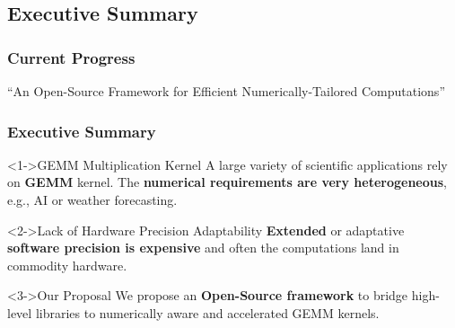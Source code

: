 \graphicspath{{../../../PhD/paper_factory/thesis_louis/Chapter5/Figs/}}
\subsection{Executive Summary}
\begin{frame}
    \frametitle{Current Progress}

    \centering
    \huge ``An Open-Source Framework for Efficient Numerically-Tailored Computations''
    \normalsize

    \vspace{1em} %

    \tableofcontents[currentsection,
                     subsectionstyle=show/shaded/hide,
                     sectionstyle=show/hide]

\end{frame}


\begin{frame}
    \frametitle{Executive Summary}

        \begin{block}<1->{GEMM Multiplication Kernel}
		A large variety of scientific applications rely on \textbf{GEMM } kernel. The \textbf{numerical requirements are very heterogeneous}, e.g., AI or weather forecasting.
        \end{block}

        \begin{exampleblock}<2->{Lack of Hardware Precision Adaptability}
		\textbf{Extended} or adaptative \textbf{software precision is expensive} and often the computations land in commodity hardware.
        \end{exampleblock}

        \begin{alertblock}<3->{Our Proposal}
		We propose an \textbf{Open-Source framework} to bridge high-level libraries to numerically aware and accelerated GEMM kernels.
        \end{alertblock}
\end{frame}
